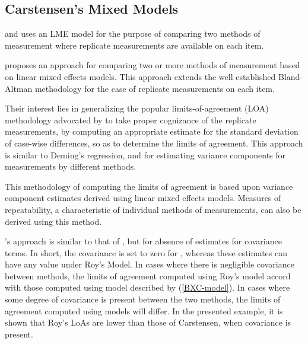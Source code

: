\documentclass[12pt, a4paper]{report}
\theoremstyle{plain}
\theoremstyle{definition}
\theoremstyle{remark}
\begin{document}
\subsection{Carstensen's Mixed Models}


\citet{BXC2004} and \citet{BXC2008} uses an LME model for the purpose of comparing two methods of measurement where replicate measurements are available on each item. 

\citet{BXC2008} proposes an approach for comparing two or more methods of measurement based on linear mixed effects models. This approach extends the well established Bland-Altman methodology for the case of replicate measurements on each item. 

Their interest lies in generalizing the popular limits-of-agreement (LOA) methodology advocated by \citet{BA86} to take proper cognizance of the replicate measurements, by computing an appropriate estimate for the standard deviation of case-wise differences, so as to determine the limits of agreement.  This approach is similar to Deming's regression, and for estimating variance components for measurements by different methods. 

This methodology of computing the limits of
agreement is based upon variance component estimates derived using linear mixed effects models. Measures of repeatability, a characteristic of individual methods of measurements, can also be derived using this method.



\citet{BXC2008}'s approach is similar to that of \citet{ARoy2009}, but for absence of estimates for covariance terms. In short, the covariance is set to zero for \citet{BXC2008}, whereas these estimates can have any value under Roy's Model. In cases where there is negligible covariance between methods, the limits of agreement computed using Roy's model accord with those computed using model described by (\ref{BXC-model}). In cases where some degree of covariance is present between the two methods, the limits of agreement computed using models will differ. In the presented
example, it is shown that Roy's LoAs are lower than those of Carstensen, when covariance is present.






\end{document}
